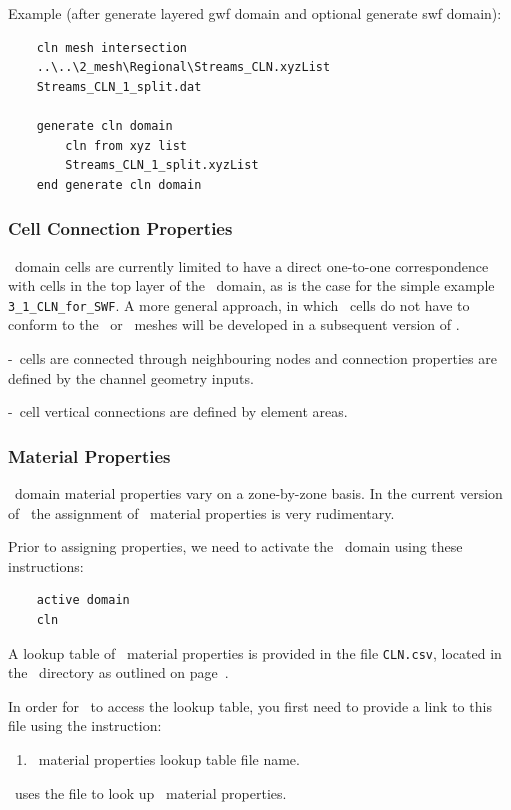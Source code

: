 Example (after {\sf generate layered gwf domain} and optional {\sf generate swf domain}):
\begin{verbatim}
    cln mesh intersection
    ..\..\2_mesh\Regional\Streams_CLN.xyzList
    Streams_CLN_1_split.dat

    generate cln domain
        cln from xyz list
        Streams_CLN_1_split.xyzList
    end generate cln domain
\end{verbatim}

\subsubsection{Cell Connection Properties}  

\cln\ domain cells are currently limited to have a direct one-to-one correspondence with cells in the top layer of the \gwf\ domain, as is the case for the simple example \texttt{3\_1\_CLN\_for\_SWF}.  A more general approach, in which \cln\ cells do not have to conform to the \gwf\ or \swf\ meshes will be developed in a subsequent version of \mut.

\cln-\cln\ cells are connected through neighbouring nodes and connection properties are defined by the channel geometry inputs.

\cln-\gwf\ cell vertical connections are defined by element areas.

\subsubsection{Material Properties}  
\cln\ domain material properties vary on a zone-by-zone basis.  In the current version of \mut\, the assignment of \cln\ material properties is very rudimentary.

Prior to assigning properties, we need to activate the \cln\ domain using these instructions:
\begin{verbatim}
    active domain
    cln
\end{verbatim}

A lookup table of \cln\ material properties  is provided in the file \texttt{CLN.csv}, located in the \bin\ directory as outlined on page~\pageref{page:userbin}.

In order for \mut\ to access the lookup table, you first need to provide a link to this file using the instruction:

    {
        \squish
        \begin{enumerate}
        \item {}  \cln\ material properties lookup table file name.
        \end{enumerate}
          \mut\ uses the file  to look up \cln\ material properties.
    }

